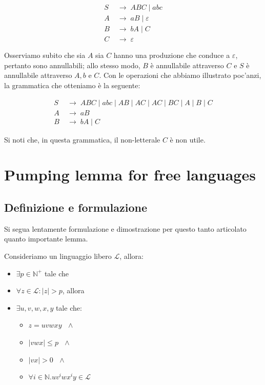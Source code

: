\documentclass[class=book, crop=false, oneside]{standalone}
\begin{document}
\begin{align*}
  S\; & \to\; ABC\; |\; abc \\
  A\; & \to\; aB\; |\; \varepsilon \\
  B\; & \to\; bA\; |\; C \\
  C\; & \to\; \varepsilon
\end{align*}

Osserviamo subito che sia \(A\) sia \(C\) hanno una produzione che conduce a \(\varepsilon\), pertanto sono annullabili; allo stesso modo, \(B\) è annullabile attraverso \(C\) e \(S\) è annullabile attraverso \(A, b\) e \(C\). Con le operazioni che abbiamo illustrato poc'anzi, la grammatica che otteniamo è la seguente:


\begin{align*}
  S\; & \to\; ABC\; |\; abc\; |\; AB\; |\; AC\; |\; AC\; |\; BC\; |\; A\; |\; B\; |\; C \\
  A\; & \to \; aB \\
  B\; & \to\; bA\; |\; C
\end{align*}

Si noti che, in questa grammatica, il non-letterale \(C\) è non utile.

\section{Pumping lemma for free languages}

\subsection{Definizione e formulazione}

Si segua lentamente formulazione e dimostrazione per questo tanto articolato quanto importante lemma.

\begin{lemma}
  Consideriamo un linguaggio libero \(\mathcal{L}\), allora:
  \begin{itemize}
    \item \(\exists p \in \mathbb{N}^+\) tale che
    \item \(\forall z \in \mathcal{L} : |z| > p\), allora
    \item \(\exists u, v, w, x, y\) tale che:
    \begin{itemize}
      \item \(z = uvwxy \textrm{ } \land\)
      \item \(|vwx| \leq p \textrm{ } \land\)
      \item \(|vx| > 0 \textrm{ }\land\)
      \item \(\forall i \in \mathbb{N}.uv^iwx^iy \in \mathcal{L}\)
    \end{itemize}
  \end{itemize}
\end{lemma}
\end{document}
